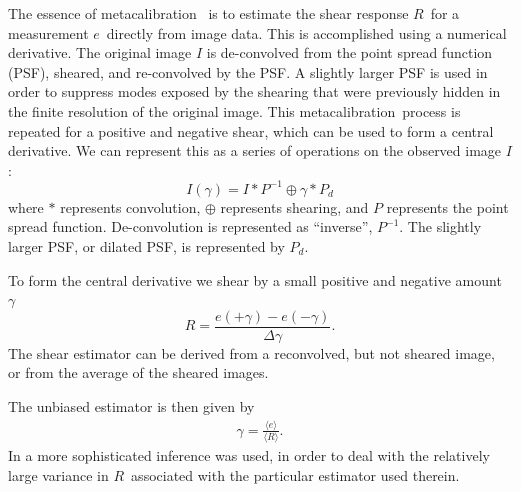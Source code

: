 \documentclass[usegraphicx,usenatbib]{mn2e}
\newcommand{\est}{$e$}
\newcommand{\mest}{e}
\newcommand{\mcal}{metacalibration}
\newcommand{\mcalR}{$R$}
\begin{document}
The essence of \mcal\ \citep{HuffMcal} is to estimate the shear response
\mcalR\ for a measurement \est\ directly from image data.  This is
accomplished using a numerical derivative.  The original image $I$ is
de-convolved from the point spread function (PSF), sheared, and re-convolved
by the PSF.  A slightly larger PSF is used in order to suppress modes 
exposed by the shearing that were previously hidden in the finite
resolution of the original image.  This \mcal\ process is repeated for a
positive and negative shear, which can be used to form a central derivative.
We can represent this as a series of operations on the observed image $I$:
\begin{equation}
    I(\gamma) = I \ast P^{-1} \oplus \gamma \ast P_{d}
\end{equation}
where $\ast $ represents convolution, $\oplus$ represents shearing,
and $P$ represents the point spread function.  De-convolution
is represented as ``inverse'', $P^{-1}$.  The slightly larger PSF, or
dilated PSF, is represented by $P_{d}$.

To form the central derivative we shear by a small positive and negative
amount $\gamma$
\begin{equation} \label{eq:Rnum}
    R = \frac{\mest(+\gamma) - \mest(-\gamma)}{\Delta \gamma}.
\end{equation}
The shear estimator can be derived from a reconvolved, but not sheared image,
or from the average of the sheared images.


The unbiased estimator is then given by
\begin{align}
    \gamma = \frac{\langle \mest \rangle}{\langle \mbox{\mcalR} \rangle}.
\end{align}
In \cite{HuffMcal} a more sophisticated inference was used, in order to deal
with the relatively large variance in \mcalR\ associated with the particular
estimator used therein.
\end{document}
